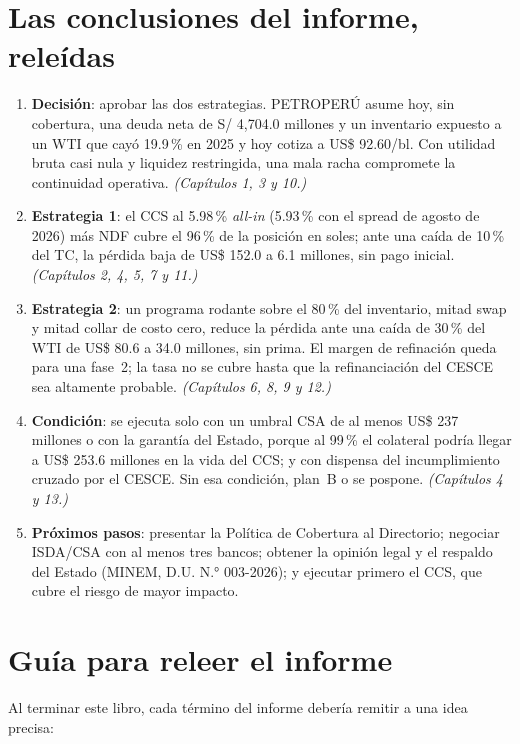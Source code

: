 \section{Las conclusiones del informe, releídas}

\begin{enumerate}
\item \textbf{Decisión}: aprobar las dos estrategias. PETROPERÚ asume hoy, sin cobertura, una deuda neta de S/ 4,704.0 millones y un inventario expuesto a un WTI que cayó 19.9\,\% en 2025 y hoy cotiza a US\$ 92.60/bl. Con utilidad bruta casi nula y liquidez restringida, una mala racha compromete la continuidad operativa. \emph{(Capítulos 1, 3 y 10.)}
\item \textbf{Estrategia 1}: el CCS al 5.98\,\% \emph{all-in} (5.93\,\% con el spread de agosto de 2026) más NDF cubre el 96\,\% de la posición en soles; ante una caída de 10\,\% del TC, la pérdida baja de US\$ 152.0 a 6.1 millones, sin pago inicial. \emph{(Capítulos 2, 4, 5, 7 y 11.)}
\item \textbf{Estrategia 2}: un programa rodante sobre el 80\,\% del inventario, mitad swap y mitad collar de costo cero, reduce la pérdida ante una caída de 30\,\% del WTI de US\$ 80.6 a 34.0 millones, sin prima. El margen de refinación queda para una fase~2; la tasa no se cubre hasta que la refinanciación del CESCE sea altamente probable. \emph{(Capítulos 6, 8, 9 y 12.)}
\item \textbf{Condición}: se ejecuta solo con un umbral CSA de al menos US\$ 237 millones o con la garantía del Estado, porque al 99\,\% el colateral podría llegar a US\$ 253.6 millones en la vida del CCS; y con dispensa del incumplimiento cruzado por el CESCE. Sin esa condición, plan~B o se pospone. \emph{(Capítulos 4 y 13.)}
\item \textbf{Próximos pasos}: presentar la Política de Cobertura al Directorio; negociar ISDA/CSA con al menos tres bancos; obtener la opinión legal y el respaldo del Estado (MINEM, D.U. N.° 003-2026); y ejecutar primero el CCS, que cubre el riesgo de mayor impacto.
\end{enumerate}

\section{Guía para releer el informe}

Al terminar este libro, cada término del informe debería remitir a una idea precisa:

